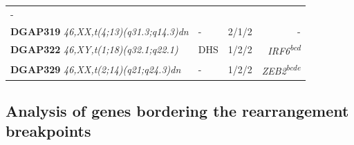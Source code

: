 \documentclass[a4paper,twoside=true,openright,parskip=full,chapterprefix=true,11pt,headings=normal,bibliography=totoc,listof=totoc,titlepage=on,captions=tableabove,draft=false]{scrreprt}
\theoremstyle{definition}
\theoremstyle{definition}
\theoremstyle{definition}
\theoremstyle{remark}
\begin{document}
\begin{longtable}[]{@{}lllr@{}}
\begin{minipage}[t]{0.18\columnwidth}
-\strut
\end{minipage}\tabularnewline
\begin{minipage}[t]{0.25\columnwidth}\raggedright
\textbf{DGAP319} \emph{46,XX,t(4;13)(q31.3;q14.3)dn}\strut
\end{minipage} & \begin{minipage}[t]{0.19\columnwidth}\raggedright
-\strut
\end{minipage} & \begin{minipage}[t]{0.26\columnwidth}\raggedright
2/1/2\strut
\end{minipage} & \begin{minipage}[t]{0.18\columnwidth}\raggedleft
-\strut
\end{minipage}\tabularnewline
\begin{minipage}[t]{0.25\columnwidth}\raggedright
\textbf{DGAP322} \emph{46,XY,t(1;18)(q32.1;q22.1)}\strut
\end{minipage} & \begin{minipage}[t]{0.19\columnwidth}\raggedright
DHS\strut
\end{minipage} & \begin{minipage}[t]{0.26\columnwidth}\raggedright
1/2/2\strut
\end{minipage} & \begin{minipage}[t]{0.18\columnwidth}\raggedleft
\emph{IRF6\textsuperscript{bcd}}\strut
\end{minipage}\tabularnewline
\begin{minipage}[t]{0.25\columnwidth}\raggedright
\textbf{DGAP329} \emph{46,XX,t(2;14)(q21;q24.3)dn}\strut
\end{minipage} & \begin{minipage}[t]{0.19\columnwidth}\raggedright
-\strut
\end{minipage} & \begin{minipage}[t]{0.26\columnwidth}\raggedright
1/2/2\strut
\end{minipage} & \begin{minipage}[t]{0.18\columnwidth}\raggedleft
\emph{ZEB2\textsuperscript{bcde}}\strut
\end{minipage}\tabularnewline
\bottomrule
\end{longtable}

\hypertarget{analysis-of-genes-bordering-the-rearrangement-breakpoints}{%
\subsection{Analysis of genes bordering the rearrangement
breakpoints}\label{analysis-of-genes-bordering-the-rearrangement-breakpoints}}
\end{document}
